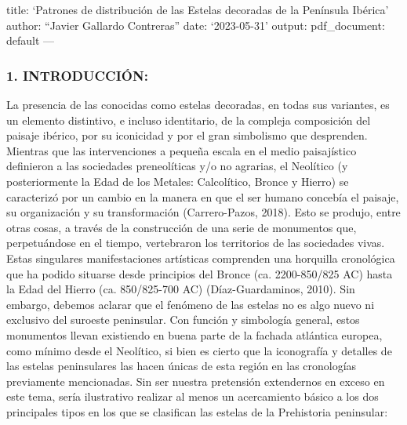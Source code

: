 \documentclass[
]{article}
\author{}
\date{\vspace{-2.5em}}
\begin{document}
title: `Patrones de distribución de las Estelas decoradas de la
Península Ibérica' author: ``Javier Gallardo Contreras'' date:
`2023-05-31' output: pdf\_document: default ---

\hypertarget{introducciuxf3n}{%
\subsubsection{1. INTRODUCCIÓN:}\label{introducciuxf3n}}

La presencia de las conocidas como estelas decoradas, en todas sus
variantes, es un elemento distintivo, e incluso identitario, de la
compleja composición del paisaje ibérico, por su iconicidad y por el
gran simbolismo que desprenden. Mientras que las intervenciones a
pequeña escala en el medio paisajístico definieron a las sociedades
preneolíticas y/o no agrarias, el Neolítico (y posteriormente la Edad de
los Metales: Calcolítico, Bronce y Hierro) se caracterizó por un cambio
en la manera en que el ser humano concebía el paisaje, su organización y
su transformación (Carrero-Pazos, 2018). Esto se produjo, entre otras
cosas, a través de la construcción de una serie de monumentos que,
perpetuándose en el tiempo, vertebraron los territorios de las
sociedades vivas. Estas singulares manifestaciones artísticas comprenden
una horquilla cronológica que ha podido situarse desde principios del
Bronce (ca. 2200-850/825 AC) hasta la Edad del Hierro (ca. 850/825-700
AC) (Díaz-Guardaminos, 2010). Sin embargo, debemos aclarar que el
fenómeno de las estelas no es algo nuevo ni exclusivo del suroeste
peninsular. Con función y simbología general, estos monumentos llevan
existiendo en buena parte de la fachada atlántica europea, como mínimo
desde el Neolítico, si bien es cierto que la iconografía y detalles de
las estelas peninsulares las hacen únicas de esta región en las
cronologías previamente mencionadas. Sin ser nuestra pretensión
extendernos en exceso en este tema, sería ilustrativo realizar al menos
un acercamiento básico a los dos principales tipos en los que se
clasifican las estelas de la Prehistoria peninsular:
\end{document}
